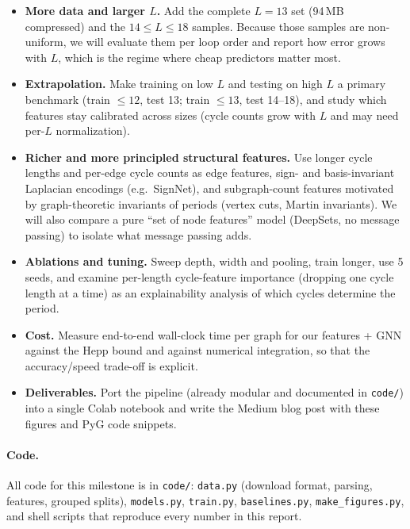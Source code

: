 \begin{itemize}\setlength\itemsep{0.1em}
\item \textbf{More data and larger $L$.} Add the complete $L=13$ set (94\,MB compressed) and the
$14\le L\le18$ samples. Because those samples are non-uniform, we will evaluate them per loop order
and report how error grows with $L$, which is the regime where cheap predictors matter most.
\item \textbf{Extrapolation.} Make training on low $L$ and testing on high $L$ a primary benchmark
(train $\le 12$, test 13; train $\le 13$, test 14--18), and study which features stay calibrated
across sizes (cycle counts grow with $L$ and may need per-$L$ normalization).
\item \textbf{Richer and more principled structural features.} Use longer cycle lengths and per-edge
cycle counts as edge features, sign- and basis-invariant Laplacian encodings (e.g.\ SignNet), and
subgraph-count features motivated by graph-theoretic invariants of periods (vertex cuts, Martin
invariants). We will also compare a pure ``set of node features'' model (DeepSets, no message
passing) to isolate what message passing adds.
\item \textbf{Ablations and tuning.} Sweep depth, width and pooling, train longer, use 5 seeds,
and examine per-length cycle-feature importance (dropping one cycle length at a time) as an
explainability analysis of which cycles determine the period.
\item \textbf{Cost.} Measure end-to-end wall-clock time per graph for our features + GNN against
the Hepp bound and against numerical integration, so that the accuracy/speed trade-off is explicit.
\item \textbf{Deliverables.} Port the pipeline (already modular and documented in \texttt{code/})
into a single Colab notebook and write the Medium blog post with these figures and PyG code snippets.
\end{itemize}

\paragraph{Code.} All code for this milestone is in \texttt{code/}: \texttt{data.py} (download
format, parsing, features, grouped splits), \texttt{models.py}, \texttt{train.py},
\texttt{baselines.py}, \texttt{make\_figures.py}, and shell scripts that reproduce every number in
this report.
